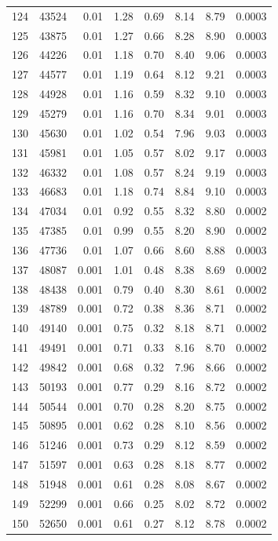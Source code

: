 \documentclass[11pt,a4paper]{article}
\begin{document}
\begin{center}
\begin{longtable}{@{}rrrrrrrr@{}}
124 & 43524 & 0.01 & 1.28 & 0.69 & 8.14 & 8.79 & 0.0003 \\
125 & 43875 & 0.01 & 1.27 & 0.66 & 8.28 & 8.90 & 0.0003 \\
126 & 44226 & 0.01 & 1.18 & 0.70 & 8.40 & 9.06 & 0.0003 \\
127 & 44577 & 0.01 & 1.19 & 0.64 & 8.12 & 9.21 & 0.0003 \\
128 & 44928 & 0.01 & 1.16 & 0.59 & 8.32 & 9.10 & 0.0003 \\
129 & 45279 & 0.01 & 1.16 & 0.70 & 8.34 & 9.01 & 0.0003 \\
130 & 45630 & 0.01 & 1.02 & 0.54 & 7.96 & 9.03 & 0.0003 \\
131 & 45981 & 0.01 & 1.05 & 0.57 & 8.02 & 9.17 & 0.0003 \\
132 & 46332 & 0.01 & 1.08 & 0.57 & 8.24 & 9.19 & 0.0003 \\
133 & 46683 & 0.01 & 1.18 & 0.74 & 8.84 & 9.10 & 0.0003 \\
134 & 47034 & 0.01 & 0.92 & 0.55 & 8.32 & 8.80 & 0.0002 \\
135 & 47385 & 0.01 & 0.99 & 0.55 & 8.20 & 8.90 & 0.0002 \\
136 & 47736 & 0.01 & 1.07 & 0.66 & 8.60 & 8.88 & 0.0003 \\
137 & 48087 & 0.001 & 1.01 & 0.48 & 8.38 & 8.69 & 0.0002 \\
138 & 48438 & 0.001 & 0.79 & 0.40 & 8.30 & 8.61 & 0.0002 \\
139 & 48789 & 0.001 & 0.72 & 0.38 & 8.36 & 8.71 & 0.0002 \\
140 & 49140 & 0.001 & 0.75 & 0.32 & 8.18 & 8.71 & 0.0002 \\
141 & 49491 & 0.001 & 0.71 & 0.33 & 8.16 & 8.70 & 0.0002 \\
142 & 49842 & 0.001 & 0.68 & 0.32 & 7.96 & 8.66 & 0.0002 \\
143 & 50193 & 0.001 & 0.77 & 0.29 & 8.16 & 8.72 & 0.0002 \\
144 & 50544 & 0.001 & 0.70 & 0.28 & 8.20 & 8.75 & 0.0002 \\
145 & 50895 & 0.001 & 0.62 & 0.28 & 8.10 & 8.56 & 0.0002 \\
146 & 51246 & 0.001 & 0.73 & 0.29 & 8.12 & 8.59 & 0.0002 \\
147 & 51597 & 0.001 & 0.63 & 0.28 & 8.18 & 8.77 & 0.0002 \\
148 & 51948 & 0.001 & 0.61 & 0.28 & 8.08 & 8.67 & 0.0002 \\
149 & 52299 & 0.001 & 0.66 & 0.25 & 8.02 & 8.72 & 0.0002 \\
150 & 52650 & 0.001 & 0.61 & 0.27 & 8.12 & 8.78 & 0.0002 \\

\end{longtable}
\end{center}
\end{document}
